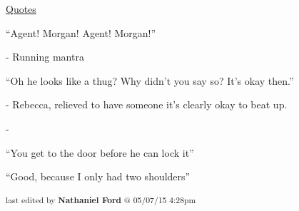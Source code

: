 \underline{  {\LARGE Quotes }  }



``Agent! Morgan! Agent! Morgan!''

- Running mantra



``Oh he looks like a thug?  Why didn't you say so?  It's okay then.''

- Rebecca, relieved to have someone it's clearly okay to beat up.

-

``You get to the door before he can lock it''

``Good, because I only had two shoulders''



\vspace{\fill}

\begin{flushright}
\textsubscript{last edited by \textbf{Nathaniel Ford} @ 05/07/15 4:28pm}
\end{flushright}
